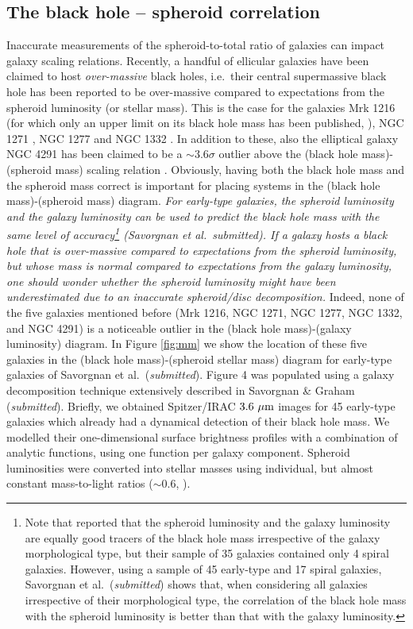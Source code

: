 \documentclass[useAMS,usenatbib,article]{mn2e}
\begin{document}
\subsection{The black hole -- spheroid correlation}
\label{sec:mm}
Inaccurate measurements of the spheroid-to-total ratio of galaxies can impact galaxy scaling relations. 
Recently, a handful of ellicular galaxies have been claimed to host \emph{over-massive} black holes, 
i.e.~their central supermassive black hole has been reported to be 
over-massive compared to expectations from the spheroid luminosity (or stellar mass).
This is the case for the galaxies Mrk 1216 (for which only an upper limit on its black hole mass has been published, 
\citealt{yildirim2015}), NGC 1271 \citep{walsh2015}, 
NGC 1277 \citep{vandenbosch2012,yildirim2015} and NGC 1332 \citep{rusli2011}.
In addition to these, also the elliptical galaxy NGC 4291 has been claimed to be a $\sim$$3.6\sigma$ outlier 
above the (black hole mass)-(spheroid mass) scaling relation \citep{bogdan2012}. 
Obviously, having both the black hole mass and the spheroid mass correct is important 
for placing systems in the (black hole mass)-(spheroid mass) diagram. 
\emph{For early-type galaxies, the spheroid luminosity and the galaxy luminosity 
can be used to predict the black hole mass with the same level of accuracy\footnote{Note that 
\cite{lasker2014anal} reported that the spheroid luminosity and the galaxy luminosity are equally good tracers of the black hole mass 
irrespective of the galaxy morphological type, but their sample of 35 galaxies contained only 4 spiral galaxies. 
However, using a sample of 45 early-type and 17 spiral galaxies, 
Savorgnan et al.~(\emph{submitted}) shows that, when considering all galaxies irrespective of their morphological type, 
the correlation of the black hole mass with the spheroid luminosity is better than that with the galaxy luminosity.} 
(Savorgnan et al.~submitted). 
If a galaxy hosts a black hole that is over-massive compared to expectations from the spheroid luminosity, 
but whose mass is normal compared to expectations from the galaxy luminosity, 
one should wonder whether the spheroid luminosity might have been underestimated 
due to an inaccurate spheroid/disc decomposition. }
Indeed, none of the five galaxies mentioned before (Mrk 1216, NGC 1271, NGC 1277, NGC 1332, and NGC 4291) is a noticeable outlier 
in the (black hole mass)-(galaxy luminosity) diagram. 
In Figure \ref{fig:mm} we show the location of these five galaxies in the (black hole mass)-(spheroid stellar mass) diagram 
for early-type galaxies of Savorgnan et al.~(\emph{submitted}). 
Figure 4 was populated using a galaxy decomposition technique extensively described in Savorgnan \& Graham (\emph{submitted}). 
Briefly, we obtained Spitzer/IRAC $3.6~\rm \mu m$ images for 45 early-type galaxies 
which already had a dynamical detection of their black hole mass. 
We modelled their one-dimensional surface brightness profiles with a combination of analytic functions, using one function per galaxy component. 
Spheroid luminosities were converted into stellar masses using individual, but almost constant mass-to-light ratios ($\sim$$0.6$, \citealt{meidt2014-MNRAS}). 
\end{document}
